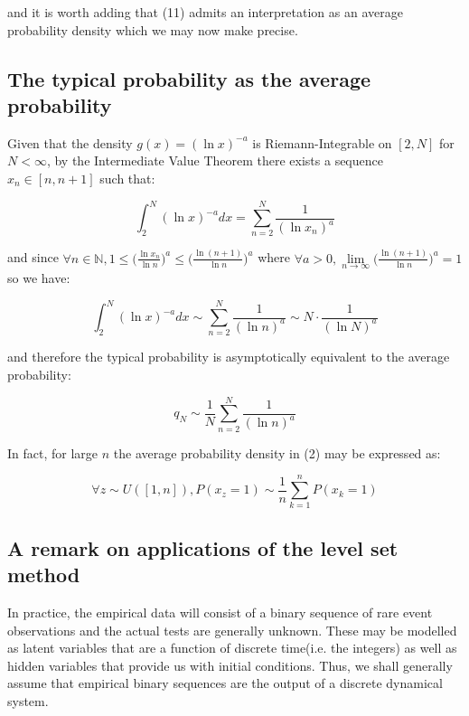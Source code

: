 \documentclass{article}
\begin{document}
and it is worth adding that (11) admits an interpretation as 
an average probability density which we may now make precise.
\newpage  

\subsection{The typical probability as the average probability}

Given that the density $g(x) = (\ln x)^{-a}$ is Riemann-Integrable on $[2,N]$ for $N < \infty$, by the Intermediate Value Theorem there exists a sequence $x_n \in [n,n+1]$ such that: 

\begin{equation}
\int_{2}^N (\ln x)^{-a} dx = \sum_{n=2}^N \frac{1}{(\ln x_n)^a}
\end{equation}

and since $\forall n \in \mathbb{N}, 1 \leq \big(\frac{\ln x_n}{\ln n}\big)^a \leq \big(\frac{\ln (n+1)}{\ln n}\big)^a$ where $\forall a > 0, \lim\limits_{n \to \infty} \big(\frac{\ln (n+1)}{\ln n}\big)^a = 1$ so we have: 

\begin{equation}
\int_{2}^N (\ln x)^{-a} dx \sim \sum_{n=2}^N \frac{1}{(\ln n)^a} \sim N \cdot \frac{1}{(\ln N)^a}
\end{equation}

and therefore the typical probability is asymptotically equivalent to the 
average probability: 

\begin{equation}
q_N \sim \frac{1}{N} \sum_{n=2}^N \frac{1}{(\ln n)^a} 	
\end{equation}

In fact, for large $n$ the average probability density in (2) may be expressed as: 

\begin{equation}
\forall z \sim U([1,n]), P(x_z = 1) \sim \frac{1}{n} \sum_{k=1}^n P(x_k = 1)	\end{equation}

\subsection{A remark on applications of the level set method}

In practice, the empirical data will consist of a binary sequence of rare event 
observations and the actual tests are generally unknown. These may be modelled 
as latent variables that are a function of discrete time(i.e. the integers) as 
well as hidden variables that provide us with initial conditions. Thus, we shall 
generally assume that empirical binary sequences are the output of a discrete dynamical system.
\end{document}
